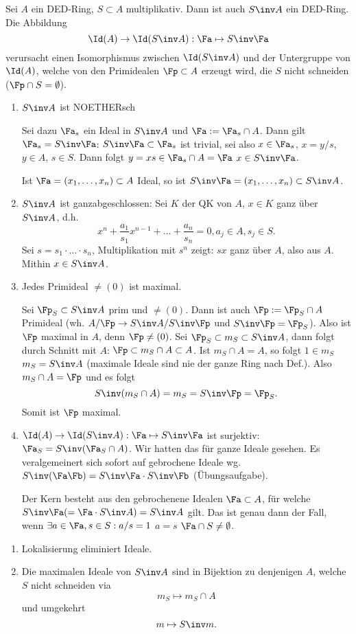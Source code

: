 \begin{Fakt}
 Sei $A$ ein DED-Ring, $S\subset A$ multiplikativ. Dann ist auch $S\inv A$ ein DED-Ring. Die Abbildung
 \[ \Id(A)\rightarrow \Id(S\inv A): \Fa\mapsto S\inv \Fa\]
 verursacht einen Isomorphismus zwischen $\Id(S\inv A)$ und der Untergruppe von $\Id(A)$, welche von den Primidealen $\Fp\subset A$ erzeugt wird, die $S$ nicht schneiden ($\Fp\cap S=\emptyset$).
\end{Fakt}

\begin{Beweis}
 \begin{enumerate}
  \item $S\inv A$ ist NOETHERsch
  
  Sei dazu $\Fa_s$ ein Ideal in $S\inv A$ und $\Fa:=\Fa_s\cap A$. Dann gilt $\Fa_s=S\inv\Fa$: $S\inv\Fa\subset\Fa_s$ ist trivial, sei also $x\in\Fa_s$, $x=y/s$, $y\in A$, $s\in S$. Dann folgt $y=xs\in\Fa_s\cap A=\Fa$ \folge $x\in S\inv\Fa$.
  
  Ist $\Fa=(x_1,\ldots,x_n)\subset A$ Ideal, so ist $S\inv \Fa=(x_1,\ldots,x_n)\subset S\inv A$.
  \item $S\inv A$ ist ganzabgeschlossen: Sei $K$ der QK von $A$, $x\in K$ ganz über $S\inv A$, d.h.
  \[ x^n+\frac{a_1}{s_1}x^{n-1}+\ldots+\frac{a_n}{s_n}=0, a_j\in A, s_j\in S.\]
  Sei $s=s_1\cdot\ldots\cdot s_n$, Multiplikation mit $s^n$ zeigt: $sx$ ganz über $A$, also aus $A$. Mithin $x\in S\inv A$.
  \item Jedes Primideal $\neq (0)$ ist maximal. 
  
  Sei $\Fp_S\subset S\inv A$ prim und $\neq(0)$. Dann ist auch $\Fp:=\Fp_S\cap A$ Primideal (wh. $A/\Fp \rightarrow S\inv A/S\inv\Fp$ und $S\inv\Fp=\Fp_S$). Also ist $\Fp$ maximal in $A$, denn $\Fp\neq (0)$. Sei 
  $\Fp_S\subset m_S\subset S\inv A$, dann folgt durch Schnitt mit $A$: $\Fp\subset m_S\cap A\subset A$.
  Ist $m_S\cap A=A$, so folgt $1\in m_S$ \folge $m_S=S\inv A$ \lightning (maximale Ideale sind nie der ganze Ring nach Def.).
  Also $m_S\cap A=\Fp$ und es folgt
  \[S\inv(m_S\cap A)=m_S=S\inv\Fp=\Fp_S. \]
  Somit ist $\Fp$ maximal.
  \item $\Id(A)\rightarrow\Id(S\inv A): \Fa\mapsto S\inv\Fa$ ist surjektiv: $\Fa_S=S\inv(\Fa_S\cap A)$. Wir hatten das für ganze Ideale gesehen. Es veralgemeinert sich sofort auf gebrochene Ideale wg. $S\inv(\Fa\Fb)=S\inv\Fa\cdot S\inv\Fb$ (Übungsaufgabe).
  
  Der Kern besteht aus den gebrochenene Idealen $\Fa\subset A$, für welche $S\inv\Fa(=\Fa\cdot S\inv A)=S\inv A$ gilt. Das ist genau dann der Fall, wenn $\exists a\in\Fa, s\in S: a/s=1$ \gdw $a=s$ \gdw $\Fa\cap S\neq \emptyset$.
 \end{enumerate}
\end{Beweis}

\begin{Bemerkung}
 \begin{enumerate}
  \item Lokalisierung eliminiert Ideale.
  \item Die maximalen Ideale von $S\inv A$ sind in Bijektion zu denjenigen $A$, welche $S$ nicht schneiden via \[m_S \mapsto m_S\cap A \] und umgekehrt \[m\mapsto S\inv m. \]
 \end{enumerate}

\end{Bemerkung}

